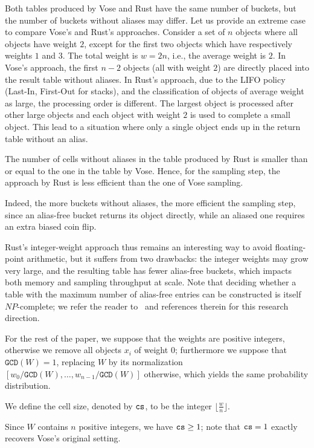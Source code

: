 Both tables produced by Vose and Rust have the same number of buckets, but the number of buckets without aliases may differ. Let us provide an extreme case to compare Vose's and Rust's approaches.
Consider a set of $n$ objects where all objects have weight $2$, except for the first two objects which have respectively weights $1$ and $3$. The total weight is $w=2n$, i.e., the average weight is $2$.
In Vose's approach, the first $n-2$ objects (all with weight $2$) are directly placed into the result table without aliases.
In Rust's approach, due to the LIFO policy (Last-In, First-Out for stacks), and the classification of objects of average weight as large, the processing order is different. 
The largest object is processed after other large objects and each object with weight $2$ is used to complete a small object.
This lead to a situation where only a single object ends up in the return table without an alias.

\begin{proposition}
    The number of cells without aliases in the table produced by Rust is smaller than or equal to the one 
    in the table by Vose. Hence, for the sampling step, the approach by Rust is less efficient than the one of Vose sampling.
\end{proposition}
Indeed, the more buckets without aliases, the more efficient the sampling step, since an alias-free bucket
returns its object directly, while an aliased one requires an extra biased coin flip.

Rust's integer-weight approach thus remains an interesting way to avoid floating-point arithmetic, but it
suffers from two drawbacks: the integer weights may grow very large, and the resulting table has fewer
alias-free buckets, which impacts both memory and sampling throughput at scale. Note that deciding whether
a table with the maximum number of alias-free entries can be constructed is itself $NP$-complete; we refer
the reader to~\cite{SJ05} and references therein for this research direction.


For the rest of the paper, we suppose that the weights are positive integers, otherwise we remove all objects
$x_i$ of weight $0$; furthermore we suppose that $\texttt{GCD}(W) = 1$, replacing $W$ by its normalization
$[w_0/\texttt{GCD}(W), \dots, w_{n-1}/\texttt{GCD}(W)]$ otherwise, which yields the same probability distribution.

\begin{definition}
    We define the cell size, denoted by $\texttt{cs}$, to be the integer $\lfloor \frac{w}{n} \rfloor$.
\end{definition}
\begin{remark*}
    Since $W$ contains $n$ positive integers, we have $\texttt{cs} \geq 1$; note that $\texttt{cs} = 1$ exactly recovers
    Vose's original setting.
\end{remark*}

